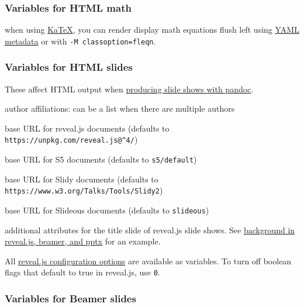 \documentclass[
]{article}
\providecommand{\tightlist}{%
  \setlength{\itemsep}{0pt}\setlength{\parskip}{0pt}}
\begin{document}
\subsubsection{Variables for HTML math}\label{variables-for-html-math}

\begin{description}
\tightlist
\item[\texttt{classoption}]
when using \hyperref[option--katex]{KaTeX}, you can render display math
equations flush left using \hyperref[layout]{YAML metadata} or with
\texttt{-M\ classoption=fleqn}.
\end{description}

\subsubsection{Variables for HTML
slides}\label{variables-for-html-slides}

These affect HTML output when \hyperref[slide-shows]{producing slide
shows with pandoc}.

\begin{description}
\tightlist
\item[\texttt{institute}]
author affiliations: can be a list when there are multiple authors
\item[\texttt{revealjs-url}]
base URL for reveal.js documents (defaults to
\texttt{https://unpkg.com/reveal.js@\^{}4/})
\item[\texttt{s5-url}]
base URL for S5 documents (defaults to \texttt{s5/default})
\item[\texttt{slidy-url}]
base URL for Slidy documents (defaults to
\texttt{https://www.w3.org/Talks/Tools/Slidy2})
\item[\texttt{slideous-url}]
base URL for Slideous documents (defaults to \texttt{slideous})
\item[\texttt{title-slide-attributes}]
additional attributes for the title slide of reveal.js slide shows. See
\hyperref[background-in-reveal.js-beamer-and-pptx]{background in
reveal.js, beamer, and pptx} for an example.
\end{description}

All \href{https://revealjs.com/config/}{reveal.js configuration options}
are available as variables. To turn off boolean flags that default to
true in reveal.js, use \texttt{0}.

\subsubsection{Variables for Beamer
slides}\label{variables-for-beamer-slides}
\end{document}
